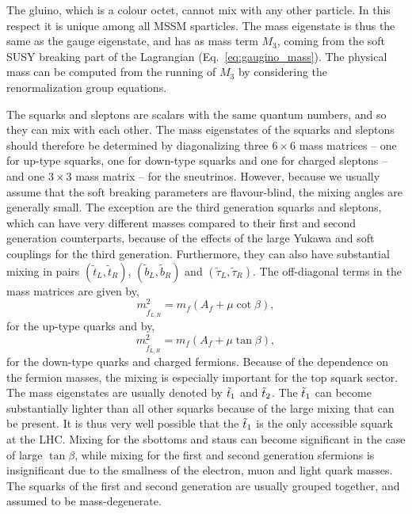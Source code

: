 The gluino, which is a colour octet, cannot mix with any other particle. In this respect it is
unique among all MSSM sparticles. The mass eigenstate is thus the same as the gauge eigenstate, and
has as mass term $M_3$, coming from the soft SUSY breaking part of the Lagrangian
(Eq.~\ref{eq:gaugino_mass}). The physical mass can be computed from the running of $M_3$ by
considering the renormalization group equations. 

The squarks and sleptons are scalars with the same quantum numbers, and so they can mix with each
other. The mass eigenstates of the squarks and sleptons should therefore be determined by
diagonalizing three $6\times6$ mass matrices -- one for up-type squarks, one for down-type squarks
and one for charged sleptons -- and one $3\times3$ mass matrix -- for the sneutrinos. 
However, because we usually assume that the soft breaking parameters are flavour-blind,
the mixing angles are generally small. The exception are the third generation squarks and sleptons,
which can have very different masses compared to their first and second generation counterparts,
because of the effects of the large Yukawa and soft couplings for the third 
generation. Furthermore, they can also have substantial mixing in pairs
$(\widetilde{t}_L,\widetilde{t}_R)$, $(\widetilde{b}_L,\widetilde{b}_R)$ and
$(\widetilde{\tau}_L,\widetilde{\tau}_R)$. 
The off-diagonal terms in the mass matrices are given by,
\begin{equation}
  m^2_{\widetilde{f}_{L,R}} = m_f \left( A_f + \mu \cot\beta \right),
\end{equation}
for the up-type quarks and by,
\begin{equation}
  m^2_{\widetilde{f}_{L,R}} = m_f \left( A_f + \mu \tan\beta \right),
\end{equation}
for the down-type quarks and charged fermions.
Because of the dependence on the fermion masses, the mixing is especially important for
the top squark sector. The mass eigenstates are usually denoted by $\tilde{t}_1$ and $\tilde{t}_2$.  
The $\tilde{t}_1$ can become substantially lighter than all other squarks because of the large mixing
that can be present. It is thus very well possible that the $\tilde{t}_1$ is the only accessible
squark at the LHC. 
Mixing for the sbottoms and staus can become significant in the case of large $\tan\beta$, while
mixing for the first and second generation sfermions is insignificant due to the smallness of the
electron, muon and light quark masses. The squarks of the first and second generation are usually
grouped together, and assumed to be mass-degenerate. 

